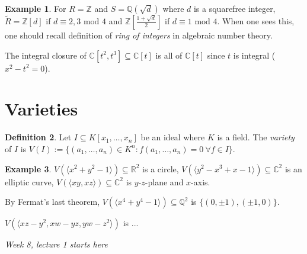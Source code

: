 \documentclass[a4paper]{article}
\newcommand{\Mod}{\text{ mod }}
\theoremstyle{definition}
\newtheorem{defn}{Definition}[subsection]
\newtheorem{example}[defn]{Example}
\begin{document}
\begin{example}
For $R=\mathbb Z$ and $S=\mathbb Q\left(\sqrt d\right)$ where $d$ is a squarefree integer, $\widetilde R=\mathbb Z[d]$ if $d\equiv 2,3\Mod 4$ and $\mathbb Z\left[\frac{1+\sqrt d}{2}\right]$ if $d\equiv 1\Mod 4$. When one sees this, one should recall definition of \textit{ring of integers} in algebraic number theory.

The integral closure of $\mathbb C[t^2,t^3]\subseteq \mathbb C[t]$ is all of $\mathbb C[t]$ since $t$ is integral ($x^2-t^2=0$).
\end{example}

\section{Varieties}
\begin{defn}
Let $I\subseteq K[x_1,\ldots,x_n]$ be an ideal where $K$ is a field. The \textit{variety} of $I$ is $V(I):=\{(a_1,\ldots,a_n)\in K^n:f(a_1,\ldots,a_n)=0 \ \forall f\in I\}$.
\end{defn}

\begin{example}
$V(\langle x^2+y^2-1 \rangle)\subseteq \mathbb R^2$ is a circle, $V(\langle y^2-x^3+x-1 \rangle)\subseteq \mathbb C^2$ is an elliptic curve,  $V(\langle xy,xz \rangle)\subseteq \mathbb C^2$ is $y$-$z$-plane and $x$-axis. 

By Fermat's last theorem, $V(\langle x^4+y^4-1\rangle)\subseteq \mathbb Q^2$ is $\{(0,\pm1),(\pm1,0)\}$.

$V(\langle xz-y^2,xw-yz,yw-z^2 \rangle)$ is ...
\end{example}

\begin{flushright}
\textit{Week 8, lecture 1 starts here}
\end{flushright}
\end{document}
